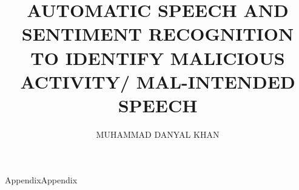 \documentclass[12pt]{nustthesis}
\title{AUTOMATIC SPEECH AND SENTIMENT RECOGNITION TO IDENTIFY MALICIOUS ACTIVITY/ MAL-INTENDED SPEECH}
\author{MUHAMMAD DANYAL KHAN}
\makeatletter
\renewcommand{\appendixname}{Appendix}
\def\@chapapp{Appendix}
\def\appendixname{Appendix}
\makeatother
\begin{document}
%

\appendixname{Appendix}



    
    
    
    
    
    
    
    



\clearpage {}  %






%   

\end{document}
